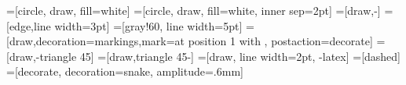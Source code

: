 \newcommand{\cov}[2]{{#1}-{#2}-cover}
\newcommand{\pc}[1]{{#1}-path cover}
\newcommand{\match}{\ensuremath{M^*}}
\newcommand{\numpaths}{\ensuremath{\sigma_\mathrm{p}}}
\newcommand{\numcycles}{\ensuremath{\sigma_\mathrm{c}}}
\newcommand{\lenpaths}{\ensuremath{\ell_\mathrm{p}}}
\newcommand{\lencycles}{\ensuremath{\ell_\mathrm{c}}}
\newcommand{\lbranch}{\ensuremath{\operatorname{lowbranch}}}
\newcommand{\ch}{\ensuremath{C}}
\newcommand{\chx}[1]{\ensuremath{c_{#1}}}
\newcommand{\parent}{\ensuremath{\operatorname{par}}}
\newcommand{\graphof}[1]{\ensuremath{\operatorname{Gr}(#1)}}
\newcommand{\argmin}{\ensuremath{\operatorname{argmin}}}
\newcommand{\eps}{\varepsilon}
\newcommand{\wmax}{\ensuremath{\w_{\max}}}
\newcommand{\wmin}{\ensuremath{\w_{\min}}}

\newcommand{\rod}[1]{\par\textcolor{red}{Rod : \textsc{#1}}\par}
\newcommand{\nini}[1]{\par\textcolor{blue}{Nini : \textsc{#1}}\par}
\newcommand{\mw}[1]{\todo{\textbf{MW:} #1}}

\usetikzlibrary{arrows,shapes,positioning,calc,decorations.pathreplacing,decorations.markings,decorations.pathmorphing,patterns}

\parskip=-1pt

=[circle, draw, fill=white]
=[circle, draw, fill=white, inner sep=2pt]
=[draw,-]
=[edge,line width=3pt]
=[gray!60, line width=5pt]
=[draw,decoration={markings,mark=at position 1 with {}}, postaction={decorate}]
=[draw,-triangle 45]
=[draw,triangle 45-]
=[draw, line width=2pt, -latex]
=[dashed]
=[decorate, decoration={snake, amplitude=.6mm}]

\newcommand\tikzvert[1]{
  \raisebox{-.5mm}{
  \hspace{-2mm}
  \begin{tikzpicture}
    \node[vertex, inner sep=.9mm, #1] {};
  \end{tikzpicture}
  \hspace{-2mm}
  }
}


